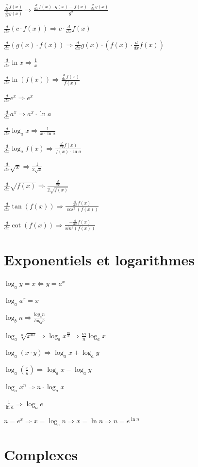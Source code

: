 \documentclass[a4paper,12pt]{article}
\begin{document}
$\frac{\frac{d}{dx} f(x)}{\frac{d}{dx} g(x)} \Rightarrow \frac{\frac{d}{dx} f(x)\cdot g(x)-f(x)\cdot \frac{d}{dx} g(x)}{g^2}$

$\frac{d}{dx}(c \cdot f(x)) \Rightarrow c \cdot \frac{d}{dx} f(x)$

$\frac{d}{dx} (g(x) \cdot f(x)) \Rightarrow \frac{d}{dx} g(x) \cdot (f(x) \cdot \frac{d}{dx} f(x))$

$\frac{d}{dx} \ln x \Rightarrow \frac{1}{x}$

$\frac{d}{dx} \ln (f(x)) \Rightarrow \frac{\frac{d}{dx} f(x)}{f(x)}$

$\frac{d}{dx} e^{x} \Rightarrow e^{x}$

$\frac{d}{dx} a^{x} \Rightarrow a^{x} \cdot  \ln a$

$\frac{d}{dx} \log_{a} x \Rightarrow \frac{1}{x \cdot \ln a}$

$\frac{d}{dx} \log_{a} f(x) \Rightarrow \frac{\frac{d}{dx} f(x)}{f(x) \cdot \ln a}$

$\frac{d}{dx} \sqrt{x} \Rightarrow \frac{1}{2\sqrt{x}}$

$\frac{d}{dx} \sqrt{f(x)} \Rightarrow \frac{\frac{d}{dx}}{2\sqrt{f(x)}}$

$\frac{d}{dx} \tan(f(x)) \Rightarrow \frac{\frac{d}{dx} f(x)}{\cos^2 (f(x))}$

$\frac{d}{dx}  \cot(f(x))\Rightarrow \frac{-\frac{d}{dx} f(x)}{sin^2(f(x))}$

\newpage
\section{Exponentiels et logarithmes}

$\log_a y = x \Leftrightarrow y=a^x$

$\log_a a^x = x$

$\log_b n \Rightarrow  \frac{log_a n}{log_a b}$

$\log_a \sqrt[n]{x^m} \Rightarrow \log_a x^{\frac{m}{n}} \Rightarrow \frac{m}{n} \log_a x$

$\log_a (x \cdot y) \Rightarrow \log_a x + \log_a y$

$\log_a (\frac{x}{y} ) \Rightarrow \log_a x - \log_a y$

$\log_a x^n \Rightarrow n \cdot \log_a x$

$\frac{1}{\ln a} \Rightarrow \log_a e$

$n = e^x \Rightarrow x = \log_e n \Rightarrow x = \ln n \Rightarrow n = e^{\ln n}$

\newpage
\section{Complexes}
\end{document}
